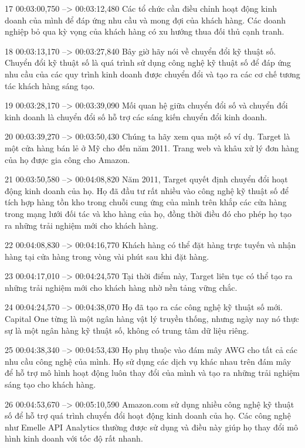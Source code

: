 17
00:03:00,750 --> 00:03:12,480
Các tổ chức cần điều chỉnh hoạt động kinh doanh của mình để đáp ứng nhu cầu và mong đợi của khách hàng.  Các doanh nghiệp bỏ qua kỳ vọng của khách hàng có xu hướng thua đối thủ cạnh tranh.

18
00:03:13,170 --> 00:03:27,840
Bây giờ hãy nói về chuyển đổi kỹ thuật số.  Chuyển đổi kỹ thuật số là quá trình sử dụng công nghệ kỹ thuật số để đáp ứng nhu cầu của các quy trình kinh doanh được chuyển đổi và tạo ra các cơ chế tương tác khách hàng sáng tạo.

19
00:03:28,170 --> 00:03:39,090
Mối quan hệ giữa chuyển đổi số và chuyển đổi kinh doanh là chuyển đổi số hỗ trợ các sáng kiến ​​chuyển đổi kinh doanh.

20
00:03:39,270 --> 00:03:50,430
Chúng ta hãy xem qua một số ví dụ.  Target là một cửa hàng bán lẻ ở Mỹ cho đến năm 2011. Trang web và khâu xử lý đơn hàng của họ được gia công cho Amazon.

21
00:03:50,580 --> 00:04:08,820
Năm 2011, Target quyết định chuyển đổi hoạt động kinh doanh của họ.  Họ đã đầu tư rất nhiều vào công nghệ kỹ thuật số để tích hợp hàng tồn kho trong chuỗi cung ứng của mình trên khắp các cửa hàng trong mạng lưới đối tác và kho hàng của họ, đồng thời điều đó cho phép họ tạo ra những trải nghiệm mới cho khách hàng.

22
00:04:08,830 --> 00:04:16,770
Khách hàng có thể đặt hàng trực tuyến và nhận hàng tại cửa hàng trong vòng vài phút sau khi đặt hàng.

23
00:04:17,010 --> 00:04:24,570
Tại thời điểm này, Target liên tục có thể tạo ra những trải nghiệm mới cho khách hàng nhờ nền tảng vững chắc.

24
00:04:24,570 --> 00:04:38,070
Họ đã tạo ra các công nghệ kỹ thuật số mới.  Capital One từng là một ngân hàng vật lý truyền thống, nhưng ngày nay nó thực sự là một ngân hàng kỹ thuật số, không có trung tâm dữ liệu riêng.

25
00:04:38,340 --> 00:04:53,430
Họ phụ thuộc vào đám mây AWG cho tất cả các nhu cầu công nghệ của mình.  Họ sử dụng các dịch vụ khác nhau trên đám mây để hỗ trợ mô hình hoạt động luôn thay đổi của mình và tạo ra những trải nghiệm sáng tạo cho khách hàng.

26
00:04:53,670 --> 00:05:10,590
Amazon.com sử dụng nhiều công nghệ kỹ thuật số để hỗ trợ quá trình chuyển đổi hoạt động kinh doanh của họ.  Các công nghệ như Emelle API Analytics thường được sử dụng và điều này giúp họ thay đổi mô hình kinh doanh với tốc độ rất nhanh.

